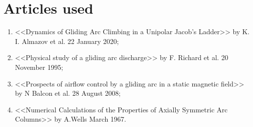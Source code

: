 \section*{Articles used}

\begin{enumerate}[label = \Roman*.]
	\item <<Dynamics of Gliding Arc Climbing
in a Unipolar Jacob’s Ladder>> by K. I. Almazov et al. 22 January 2020;

	\item <<Physical study of a gliding arc discharge>> by F. Richard et al. 20 November 1995;

	\item <<Prospects of airflow control by a gliding arc in a static magnetic field>> by N Balcon et al. 28 August 2008;

	\item <<Numerical Calculations of the Properties of Axially Symmetric Arc Columns>> by A.Wells March 1967.
\end{enumerate}
